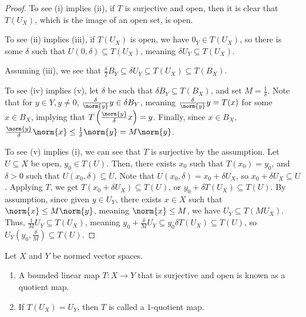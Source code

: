 \documentclass[10pt]{mypackage}
\begin{document}
\begin{proof}\hfill
  To see (i) implies (ii), if $T$ is surjective and open, then it is clear that $T\left(U_X\right)$, which is the image of an open set, is open.\newline

  To see (ii) implies (iii), if $T\left(U_X\right)$ is open, we have $0_Y\in T\left(U_X\right)$, so there is some $\delta$ such that $U\left(0,\delta\right) \subseteq T\left(U_X\right)$, meaning $\delta U_{Y} \subseteq T\left(U_X\right)$.\newline

  Assuming (iii), we see that $\frac{\delta}{2}B_Y \subseteq \delta U_Y \subseteq T\left(U_X\right)\subseteq T\left(B_X\right)$.\newline

  To see (iv) implies (v), let $\delta$ be such that $\delta B_Y\subseteq T\left(B_X\right)$, and set $M = \frac{1}{\delta}$. Note that for $y\in Y,y\neq 0$, $\frac{\delta}{\norm{y}}y\in \delta B_Y$, meaning $\frac{\delta}{\norm{y}} y = T(x)$ for some $x\in B_X$, implying that $T\left(\frac{\norm{y}}{\delta}x\right) = y$. Finally, since $x\in B_X$, $\frac{\norm{y}}{\delta}\norm{x} \leq \frac{1}{\delta}\norm{y} = M\norm{y}$.\newline

  To see (v) implies (i), we can see that $T$ is surjective by the assumption. Let $U\subseteq X$ be open, $y_0\in T(U)$. Then, there exists $x_0$ such that $T\left(x_0\right) = y_0$, and $\delta > 0$ such that $U\left(x_0,\delta\right)\subseteq U$. Note that $U\left(x_0,\delta\right) = x_0 + \delta U_X$, so $x_0 + \delta U_X \subseteq U$. Applying $T$, we get $T\left(x_0 + \delta U_X\right)\subseteq T(U)$, or $y_0 + \delta T\left(U_X\right)\subseteq T(U)$. By assumption, since given $y\in U_Y$, there exists $x\in X$ such that $\norm{x} \leq M\norm{y}$, meaning $\norm{x}\leq M$, we have $U_Y\subseteq T\left(MU_X\right)$. Thus, $\frac{1}{M}U_Y\subseteq T\left(U_X\right)$, meaning $y_0 + \frac{\delta}{M}U_Y\subseteq y_0\delta T\left(U_X\right)\subseteq T(U)$, so $U_Y\left(y_0,\frac{\delta}{M}\right)\subseteq T(U)$.
\end{proof}
\begin{definition}
  Let $X$ and $Y$ be normed vector spaces.
  \begin{enumerate}[(1)]
    \item A bounded linear map $T: X\rightarrow Y$ that is surjective and open is known as a quotient map.
    \item If $T\left(U_X\right) = U_Y$, then $T$ is called a $1$-quotient map.
  \end{enumerate}
\end{definition}
\end{document}
